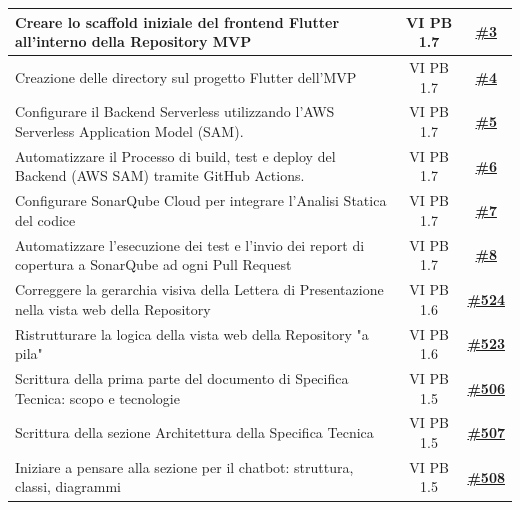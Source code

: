 \documentclass[a4paper,12pt]{article}
\newcommand{\ignoreglossary}{}
\begin{document}
\begin{longtable}{|>{\raggedright\arraybackslash}p{}|c|c|}
\hline
\rowcolor{gray!20}
Creare lo scaffold iniziale del frontend Flutter all'interno della Repository MVP & VI \ignoreglossary{PB} 1.7 & \href{https://github.com/SWE-BitByBit/project-MVP/issues/3}{\textbf{\#3}} \\
\hline
\rowcolor{white}
Creazione delle directory sul progetto Flutter dell'MVP & VI \ignoreglossary{PB} 1.7 & \href{https://github.com/SWE-BitByBit/project-MVP/issues/4}{\textbf{\#4}} \\
\hline
\rowcolor{gray!20}
Configurare il Backend Serverless utilizzando l'AWS Serverless Application Model (SAM). & VI \ignoreglossary{PB} 1.7 & \href{https://github.com/SWE-BitByBit/project-MVP/issues/5}{\textbf{\#5}} \\
\hline
\rowcolor{white}
Automatizzare il Processo di build, test e deploy del Backend (AWS SAM) tramite GitHub Actions. & VI \ignoreglossary{PB} 1.7 & \href{https://github.com/SWE-BitByBit/project-MVP/issues/6}{\textbf{\#6}} \\
\hline
\rowcolor{gray!20}
Configurare SonarQube Cloud per integrare l'Analisi Statica del codice & VI \ignoreglossary{PB} 1.7 & \href{https://github.com/SWE-BitByBit/project-MVP/issues/7}{\textbf{\#7}} \\
\hline
\rowcolor{white}
Automatizzare l'esecuzione dei test e l'invio dei report di copertura a SonarQube ad ogni Pull Request & VI \ignoreglossary{PB} 1.7 & \href{https://github.com/SWE-BitByBit/project-MVP/issues/8}{\textbf{\#8}} \\
\hline
\rowcolor{gray!20}
Correggere la gerarchia visiva della Lettera di Presentazione nella vista web della Repository & VI \ignoreglossary{PB} 1.6 & \href{https://github.com/SWE-BitByBit/SWE-docs/issues/524}{\textbf{\#524}} \\
\hline
\rowcolor{white}
Ristrutturare la logica della vista web della Repository "a pila" & VI \ignoreglossary{PB} 1.6 & \href{https://github.com/SWE-BitByBit/SWE-docs/issues/523}{\textbf{\#523}} \\
\hline
\rowcolor{gray!20}
Scrittura della prima parte del documento di Specifica Tecnica: scopo e tecnologie & VI \ignoreglossary{PB} 1.5 & \href{https://github.com/SWE-BitByBit/SWE-docs/issues/506}{\textbf{\#506}} \\
\hline
\rowcolor{white}
Scrittura della sezione Architettura della Specifica Tecnica & VI \ignoreglossary{PB} 1.5 & \href{https://github.com/SWE-BitByBit/SWE-docs/issues/507}{\textbf{\#507}} \\
\hline
\rowcolor{gray!20}
Iniziare a pensare alla sezione per il chatbot: struttura, classi, diagrammi & VI \ignoreglossary{PB} 1.5 & \href{https://github.com/SWE-BitByBit/SWE-docs/issues/508}{\textbf{\#508}} \\

\end{longtable}
\end{document}
